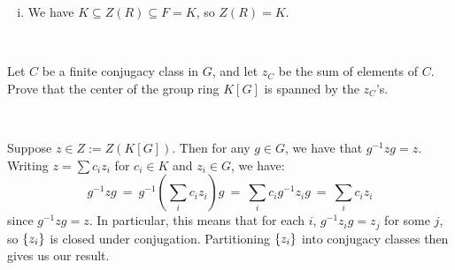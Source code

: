 \begin{pf}
\begin{enumerate}[i)]
			Since $F$ is a field, then viewing $D$ as a vector space over $F$,
			we get that $[D:K]=[D:F]\cdot[F:K]\geq[F:K]$.
			By the Structure Theorem on primitive rings, there exists some $n$
			admitting a homomorphism from a subring of $R$ to $M_{n}(D)$.
			In particular, $D\leq M_{n}(D)$ is the homomorphic image of a subring
			of $R$, so $[D:K]\leq[R:K]$.
			This gives us:
			\begin{equation*}
				[F:K] \ \leq \ [D:K] \ \leq \ [R:K] \ < \ |K|
			\end{equation*}
			as claimed.

			To conclude that $F=K$, it suffices to show that $F/K$ is an
			algebraic extension, since $K$ is algebraically closed.
			Fix $a\in F$ and consider the set:
			\begin{equation*}
				S_{a} \ := \ \set{\frac{1}{1-ka}:k\in K}
			\end{equation*}
			Since $|S_{a}| = |K| > [F:K]$ and $S_{a}\subseteq F$, it must be
			$K$-linearly dependent. Thus:
			\begin{equation*}
				\frac{c_{1}}{1-k_{1}a} \ + \ \dots \ + \
				\frac{c_{n}}{1-k_{n}a} \ = \ 0
			\end{equation*}
			for some $c_{i},k_{i}\in K$ with $c_{i}\neq0$.
			We can rearrange to get a polynomial over $K$:
			\begin{equation*}
				\left(\prod_{i=1}^{n}1-k_{i}a\right)
				\left(\sum_{i=1}^{n}\frac{c_{i}}{1-k_{i}a}\right) \ = \ 0
			\end{equation*}
			Since the coefficients are in $K$, $a$ must be algebraic.
			Thus, $F=K$ as needed.

		\item We have $K\subseteq Z(R)\subseteq F=K$, so $Z(R)=K$.
	\end{enumerate} \vspace{-0.2in}
\end{pf} \

\begin{exr}
	Let $C$ be a finite conjugacy class in $G$, and let $z_C$ be
	the sum of elements of $C$.
	Prove that the center of the group ring $K[G]$ is spanned by the $z_C$'s.
\end{exr} \

\begin{pf}
	Suppose $z\in Z:=Z(K[G])$.
	Then for any $g\in G$, we have that $g^{-1}zg=z$.
	Writing $z=\sum c_{i}z_{i}$ for $c_{i}\in K$ and $z_{i}\in G$, we have:
	\begin{equation*}
		g^{-1}zg \ = \ g^{-1}\left(\sum_{i}c_{i}z_{i}\right)g
		\ = \ \sum_{i}c_{i}g^{-1}z_{i}g \ = \ \sum_{i}c_{i}z_{i}
	\end{equation*}
	since $g^{-1}zg=z$.
	In particular, this means that for each $i$, $g^{-1}z_{i}g=z_{j}$ for
	some $j$, so $\left\{{z_{i}}\right\}$ is closed under conjugation.
	Partitioning $\left\{{z_{i}}\right\}$ into conjugacy classes then gives us our result.
\end{pf} \

